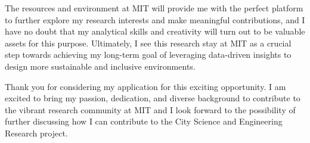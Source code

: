 \documentclass[11pt, a4paper]{awesome-cv-center-nophoto}
\begin{document}
\begin{cvletter}
The resources and environment at MIT will provide me with the perfect platform to further explore my research interests and make meaningful contributions, and I have no doubt that my analytical skills and creativity will turn out to be valuable assets for this purpose. Ultimately, I see this research stay at MIT as a crucial step towards achieving my long-term goal of leveraging data-driven insights to design more sustainable and inclusive environments.

Thank you for considering my application for this exciting opportunity. I am excited to bring my passion, dedication, and diverse background to contribute to the vibrant research community at MIT and I look forward to the possibility of further discussing how I can contribute to the City Science and Engineering Research project.

\end{cvletter}


\makeletterclosing
\end{document}
